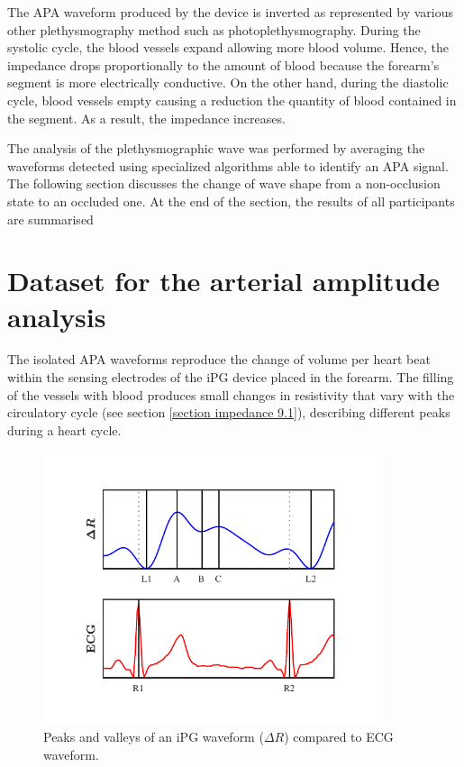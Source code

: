 The APA waveform produced by the device is inverted as represented by various other plethysmography method such as photoplethysmography. During the systolic cycle, the blood vessels expand allowing more blood volume. Hence, the impedance drops proportionally to the amount of blood because the forearm's segment is more electrically conductive. On the other hand, during the diastolic cycle, blood vessels empty causing a reduction the quantity of blood contained in the segment. As a result, the impedance increases.

The analysis of the plethysmographic wave was performed by averaging the waveforms detected using specialized algorithms able to identify an APA signal. The following section discusses the change of wave shape from a non-occlusion state to an occluded one. At the end of the section, the results of all participants are summarised 

\section{Dataset for the arterial amplitude analysis}
\label{section apa 1}
The isolated APA waveforms reproduce the change of volume per heart beat within the sensing electrodes of the iPG device placed in the forearm. The filling of the vessels with blood produces small changes in resistivity that vary with the circulatory cycle (see section \ref{section impedance 9.1}), describing different peaks during a heart cycle.

\begin{figure}[!htpb]
	\centering
	\includegraphics[width=10cm,keepaspectratio]{figure_apa_1}
	\caption[Marker ppoints in an iPG waveform]{Peaks and valleys of an iPG waveform ($\Delta R$) compared to ECG waveform.}
	\label{fig:markers iPG}
\end{figure}

